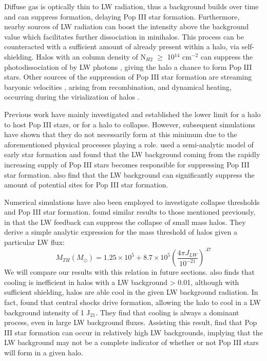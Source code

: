 \documentclass[a4paper,fleqn,usenatbib]{mnras}
\begin{document}
Diffuse gas is optically thin to LW radiation, thus a background builds over time and can suppress \hh{} formation, delaying Pop III star formation. Furthermore, nearby sources of LW radiation can boost the intensity above the background value which facilitates further \hh{} dissociation in minihalos. This process can be counteracted with a sufficient amount of \hh{} already present within a halo, via \hh{} self-shielding. Halos with an \hh{} column density of N$_{H2}$ $\geq$ 10$^{14}$ cm$^{-2}$ can suppress the photodissociation of \hh{} by LW photons \citep{Draine96}, giving the halo a chance to form Pop III stars. Other sources of the suppression of Pop III star formation are streaming baryonic velocities \citep{Tselia11, Greif11_Delay, Naoz12,OLeary12}, arising from recombination, and dynamical heating, occurring during the virialization of halos \citep{Yoshida03, Fernandez14}. 

Previous work have mainly investigated and established the lower limit for a halo to host Pop III stars, or for a halo to collapse. However, subsequent simulations have shown that they do not necessarily form at this minimum due to the aforementioned physical processes playing a role. \citet{Mebane18} used a semi-analytic model of early star formation and found that the LW background coming from the rapidly increasing supply of Pop III stars becomes responsible for suppressing Pop III star formation. \citet{Griffen18} also find that the LW background can significantly suppress the amount of potential sites for Pop III star formation. 

Numerical simulations have also been employed to investigate collapse thresholds and Pop III star formation. \citet[hereafter M01]{Machacek01} found similar results to those mentioned previously, in that the LW feedback can suppress the collapse of small mass halos. They derive a simple analytic expression for the mass threshold of halos given a particular LW flux:
\begin{equation} \label{mthresh}
	M_{TH} ( M_{\odot} ) = 1.25 \times 10^{5} + 8.7  \times 10^{5} \left( \frac{4 \pi J_{LW}}{10^{-21}} \right)^{.47}
\end{equation}
We will compare our results with this relation in future sections. \citet{Yoshida03} also finds that cooling is inefficient in halos with a LW background > 0.01, although with sufficient \hh{} shielding, halos are able cool in the given LW background radiation. In fact, \citet{Wise07_UVB} found that central shocks drive \hh{} formation, allowing the halo to cool in a LW background intensity of 1 J$_{21}$. They find that \hh{} cooling is always a dominant process, even in large LW background fluxes. Assisting this result, \citet{OShea08} find that Pop III star formation can occur in relatively high LW backgrounds, implying that the LW background may not be a complete indicator of whether or not Pop III stars will form in a given halo.    
\end{document}
